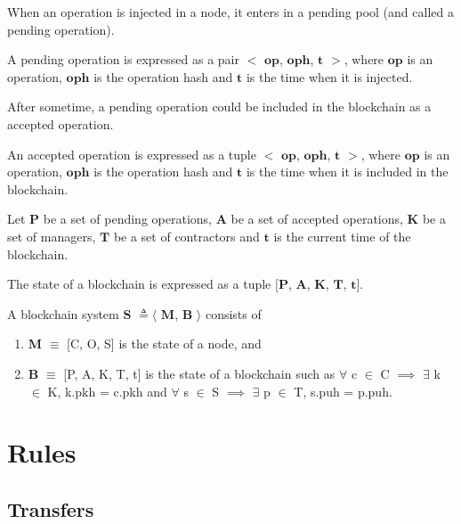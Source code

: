 \documentclass[a4paper]{llncs}
\begin{document}
When an operation is injected in a node, it enters in a pending pool (and called a pending operation). 
 \begin{definition}
A pending operation is expressed as a pair  $<$ $\mathbf{op}$, $\mathbf{oph}$, $\mathbf{t}$ $>$, where $\mathbf{op}$ is an operation, $\mathbf{oph}$ is the operation hash and $\mathbf{t}$ is the time when it is injected. 
\end{definition}
After sometime, a pending operation could be included in the blockchain as a accepted operation.
 \begin{definition}
An accepted operation  is expressed as a tuple $<$ $\mathbf{op}$, $\mathbf{oph}$, $\mathbf{t}$ $>$, where $\mathbf{op}$ is an operation, $\mathbf{oph}$ is the operation hash and $\mathbf{t}$ is the time when it is included in the blockchain. 
\end{definition}
Let $\mathbf{P}$ be a set of pending operations,  $\mathbf{A}$ be a set of accepted operations, $\mathbf{K}$ be a set of managers, $\mathbf{T}$ be a set of contractors %
and $\mathbf{t}$ is the current time of the blockchain. 

\begin{definition}[Blockchain]
The state of a blockchain is expressed as a tuple $[$$\mathbf{P}$, $\mathbf{A}$, $\mathbf{K}$, $\mathbf{T}$, $\mathbf{t}$$]$.  
\end{definition}

\begin{definition}
A blockchain system 
$\mathbf{S}$ $\triangleq\langle$ $\mathbf{M}$, $\mathbf{B}$ $\rangle$ consists of
\begin{enumerate}
\item $\mathbf{M}$ $\equiv$ [C, O, S] is the state of a node, and
\item $\mathbf{B}$ $\equiv$ [P, A, K, T, t] is the state of a blockchain 
such as $\forall$ c $\in$ C $\implies$ $\exists$ k $\in$ K, k.pkh = c.pkh and $\forall$ s $\in$ S $\implies$ $\exists$ p $\in$ T, s.puh = p.puh.
\end{enumerate}
\end{definition}

\section{Rules}
\subsection{Transfers}
\end{document}
